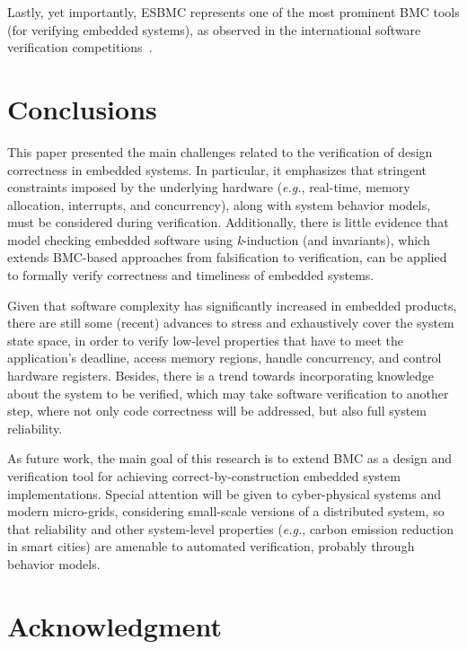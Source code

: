 \documentclass{acm_sen_article}
\begin{document}
Lastly, yet importantly, ESBMC represents one of the most prominent BMC tools (for verifying embedded systems), as observed in the international software verification competitions~\cite{MorseCNF13,MorseRCN014}.

\section{Conclusions}
\label{conclusions}

This paper presented the main challenges related to the verification of design correctness in embedded systems. In particular, it emphasizes that stringent constraints imposed by the underlying hardware ({\it e.g.}, real-time, memory allocation, interrupts, and concurrency), along with system behavior models, must be considered during verification. Additionally, there is little evidence that model checking embedded software using \textit{k}-induction (and invariants), which
extends BMC-based approaches from falsification to verification, can be applied to formally verify correctness and timeliness of embedded systems. 

Given that software complexity has significantly increased in embedded products, there are still some (recent) advances to stress and exhaustively cover the system state space, in order to verify low-level properties that have to meet the application's deadline, access memory regions, handle concurrency, and control hardware registers. Besides, there is a trend towards incorporating knowledge about the system to be verified, which may take software verification to another step, where not only code correctness will be addressed, but also full system reliability. 

As future work, the main goal of this research is to extend BMC as a design and verification tool for achieving correct-by-construction embedded system implementations. Special attention will be given to cyber-physical systems and modern micro-grids, considering small-scale versions of a distributed system, so that reliability and other system-level properties ({\it e.g.}, carbon emission reduction in smart cities) are amenable to automated verification, probably through behavior models.





\section*{Acknowledgment}
\end{document}
